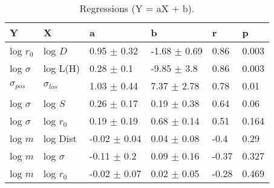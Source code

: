 \begin{table}
\centering
\caption{Regressions (Y = aX + b).}
\begin{tabular}{llllll}
\toprule
              Y &               X &                 a &                 b &      r &      p \\
\midrule
      log $r_0$ &         log $D$ &   0.95 $\pm$ 0.32 &  -1.68 $\pm$ 0.69 &   0.86 &  0.003 \\
   log $\sigma$ &        log L(H) &    0.28 $\pm$ 0.1 &   -9.85 $\pm$ 3.8 &   0.86 &  0.003 \\
 $\sigma_{pos}$ &  $\sigma_{los}$ &   1.03 $\pm$ 0.44 &   7.37 $\pm$ 2.78 &   0.78 &   0.01 \\
   log $\sigma$ &         log $S$ &   0.26 $\pm$ 0.17 &   0.19 $\pm$ 0.38 &   0.64 &   0.06 \\
   log $\sigma$ &     log $r_{0}$ &   0.19 $\pm$ 0.19 &   0.68 $\pm$ 0.14 &   0.51 &  0.164 \\
        log $m$ &        log Dist &  -0.02 $\pm$ 0.04 &   0.04 $\pm$ 0.08 &   -0.4 &   0.29 \\
        log $m$ &    log $\sigma$ &   -0.11 $\pm$ 0.2 &   0.09 $\pm$ 0.16 &  -0.37 &  0.327 \\
        log $m$ &     log $r_{0}$ &  -0.02 $\pm$ 0.07 &   0.02 $\pm$ 0.05 &  -0.28 &  0.469 \\
\bottomrule
\end{tabular}
\end{table}
